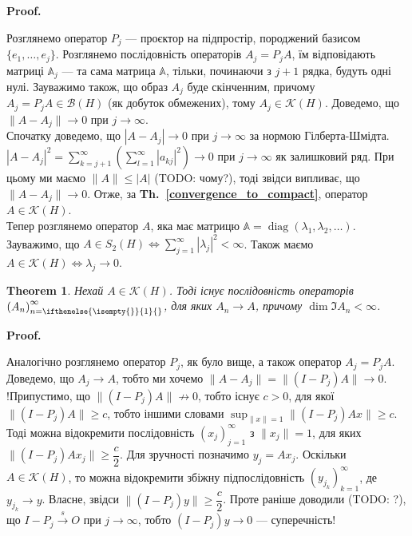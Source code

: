 \documentclass[a4paper, 10pt]{article}
\makeatletter
\theoremstyle{theoremdd}
\newtheorem{theorem}{Theorem}[subsection]
\theoremstyle{theoremdd}
\theoremstyle{theoremdd}
\theoremstyle{theoremdd}
\theoremstyle{theoremdd}
\theoremstyle{theoremdd}
\theoremstyle{theoremdd}
\theoremstyle{theoremdd}
\newcommand\thref[1]{\textbf{Th.~\ref{#1}}}
\newcommand{\tostrong}{\overset{s}{\to}}
\newcommand{\sequence}[2][]{\left({#2}\right)_{n=\ifthenelse{\isempty{#1}}{1}{#1}}^{\infty}}
\renewenvironment{proof}[1][Proof.\\]{\par
\pushQED{\hfill \qed}%
\normalfont \topsep6\p@\@plus6\p@\relax
\trivlist
\item\relax
{\bfseries
#1\@addpunct{.}}\hspace\labelsep\ignorespaces
}{%
\popQED\endtrivlist\@endpefalse
}
\DeclareMathOperator{\diag}{diag}
\makeatother
\begin{document}
\begin{proof}
Розглянемо оператор $P_j$ --- проєктор на підпростір, породжений базисом $\{e_1,\dots,e_j\}$. Розглянемо послідовність операторів $A_j = P_j A$, їм відповідають матриці $\mathbb{A}_j$ --- та сама матрица $\mathbb{A}$, тільки, починаючи з $j+1$ рядка, будуть одні нулі. Зауважимо також, що образ $A_j$ буде скінченним, причому $A_j = P_j A \in \mathcal{B}(H)$ (як добуток обмежених), тому $A_j \in \mathcal{K}(H)$. Доведемо, що $\|A - A_j\| \to 0$ при $j \to \infty$.\\
Спочатку доведемо, що $|A-A_j| \to 0$ при $j \to \infty$ за нормою Гілберта-Шмідта.\\
$|A-A_j|^2 = \displaystyle\sum_{k=j+1}^\infty \left( \sum_{l=1}^\infty |a_{kj}|^2 \right) \to 0$ при $j \to \infty$ як залишковий ряд. При цьому ми маємо $\|A\| \leq |A|$ (TODO: чому?), тоді звідси випливає, що $\|A-A_j\| \to 0$. Отже, за \thref{convergence_to_compact}, оператор $A \in \mathcal{K}(H)$.
\bigskip \\
Тепер розглянемо оператор $A$, яка має матрицю $\mathbb{A} = \diag\left(\lambda_1,\lambda_2,\dots\right)$. Зауважимо, що $A \in S_2(H) \iff \displaystyle\sum_{j=1}^\infty |\lambda_j|^2 <\infty$. Також маємо $A \in \mathcal{K}(H) \iff \lambda_j \to 0$.
\end{proof}

\begin{theorem}
Нехай $A \in \mathcal{K}(H)$. Тоді існує послідовність операторів $\sequence{A_n}$, для яких $A_n \to A$, причому $\dim \Im A_n < \infty$.
\end{theorem}

\begin{proof}
Аналогічно розглянемо оператор $P_j$, як було вище, а також оператор $A_j = P_j A$. Доведемо, що $A_j \to A$, тобто ми хочемо $\|A - A_j\| = \|(I-P_j) A\| \to 0$.\\
!Припустимо, що $\|(I-P_j)A \| \not\to 0$, тобто існує $c > 0$, для якої $\|(I - P_j) A\| \geq c$, тобто іншими словами $\displaystyle\sup_{\|x\| = 1} \|(I-P_j)A x \| \geq c$. Тоді можна відокремити послідовність $(x_j)_{j=1}^\infty$ з $\|x_j\| = 1$, для яких $\|(I-P_j) Ax_j\| \geq \dfrac{c}{2}$. Для зручності позначимо $y_j = Ax_j$. Оскільки $A \in \mathcal{K}(H)$, то можна відокремити збіжну підпослідовність $(y_{j_k})_{k=1}^\infty$, де $y_{j_k} \to y$. Власне, звідси $\|(I-P_j) y\| \geq \dfrac{c}{2}$. Проте раніше доводили (TODO: ?), що $I-P_j \tostrong O$ при $j \to \infty$, тобто $(I-P_j)y \to 0$ --- суперечність!
\end{proof}
\end{document}
